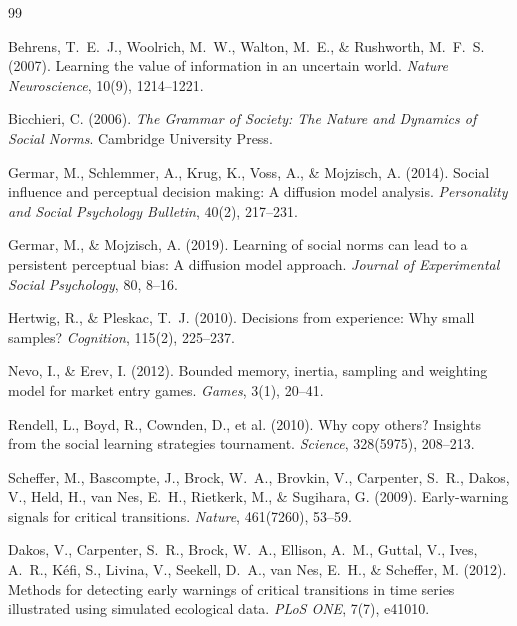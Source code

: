 \documentclass[11pt,a4paper]{article}
\begin{document}
\begin{thebibliography}{99}

Behrens, T.~E.~J., Woolrich, M.~W., Walton, M.~E., \& Rushworth, M.~F.~S. (2007).
Learning the value of information in an uncertain world.
\textit{Nature Neuroscience}, 10(9), 1214--1221.

Bicchieri, C. (2006).
\textit{The Grammar of Society: The Nature and Dynamics of Social Norms}.
Cambridge University Press.

Germar, M., Schlemmer, A., Krug, K., Voss, A., \& Mojzisch, A. (2014).
Social influence and perceptual decision making: A diffusion model analysis.
\textit{Personality and Social Psychology Bulletin}, 40(2), 217--231.

Germar, M., \& Mojzisch, A. (2019).
Learning of social norms can lead to a persistent perceptual bias: A diffusion model approach.
\textit{Journal of Experimental Social Psychology}, 80, 8--16.

Hertwig, R., \& Pleskac, T.~J. (2010).
Decisions from experience: Why small samples?
\textit{Cognition}, 115(2), 225--237.

Nevo, I., \& Erev, I. (2012).
Bounded memory, inertia, sampling and weighting model for market entry games.
\textit{Games}, 3(1), 20--41.

Rendell, L., Boyd, R., Cownden, D., et al. (2010).
Why copy others? Insights from the social learning strategies tournament.
\textit{Science}, 328(5975), 208--213.

Scheffer, M., Bascompte, J., Brock, W.~A., Brovkin, V., Carpenter, S.~R., Dakos, V., Held, H., van Nes, E.~H., Rietkerk, M., \& Sugihara, G. (2009).
Early-warning signals for critical transitions.
\textit{Nature}, 461(7260), 53--59.

Dakos, V., Carpenter, S.~R., Brock, W.~A., Ellison, A.~M., Guttal, V., Ives, A.~R., K\'{e}fi, S., Livina, V., Seekell, D.~A., van Nes, E.~H., \& Scheffer, M. (2012).
Methods for detecting early warnings of critical transitions in time series illustrated using simulated ecological data.
\textit{PLoS ONE}, 7(7), e41010.


\end{thebibliography}
\end{document}
